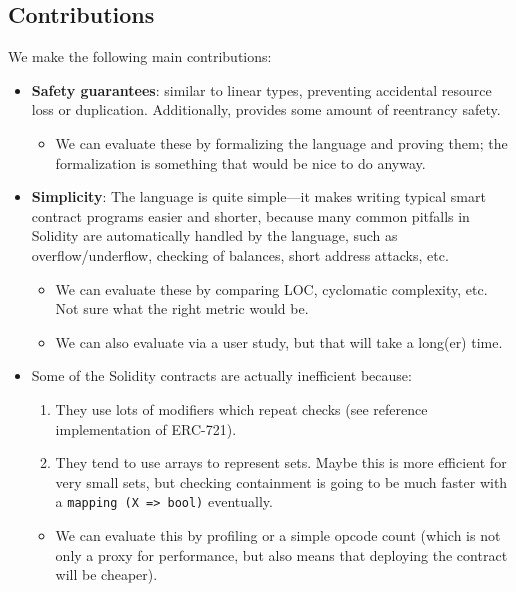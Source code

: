 \documentclass[10pt]{article}
\begin{document}
\subsection{Contributions}

We make the following main contributions:
\begin{itemize}
    \item \textbf{Safety guarantees}: similar to  linear types, preventing accidental resource loss or duplication.
        Additionally, provides some amount of reentrancy safety.

        \begin{itemize}
            \item We can evaluate these by formalizing the language and proving them; the formalization is something that would be nice to do anyway.
        \end{itemize}

    \item \textbf{Simplicity}: The language is quite simple---it makes writing typical smart contract programs easier and shorter, because many common pitfalls in Solidity are automatically handled by the language, such as overflow/underflow, checking of balances, short address attacks, etc.

        \begin{itemize}
            \item We can evaluate these by comparing LOC, cyclomatic complexity, etc.
                Not sure what the right metric would be.

            \item We can also evaluate via a user study, but that will take a long(er) time.
        \end{itemize}

    \item {}
        Some of the Solidity contracts are actually inefficient because:
        \begin{enumerate}
            \item They use lots of modifiers which repeat checks (see reference implementation of ERC-721).
            \item They tend to use arrays to represent sets.
                Maybe this is more efficient for very small sets, but checking containment is going to be much faster with a \lstinline{mapping (X => bool)} eventually.
        \end{enumerate}

        \begin{itemize}
            \item We can evaluate this by profiling or a simple opcode count (which is not only a proxy for performance, but also means that deploying the contract will be cheaper).
        \end{itemize}
\end{itemize}
\end{document}
